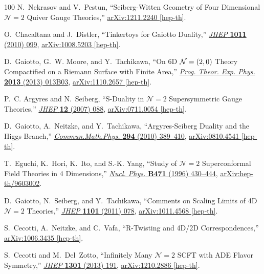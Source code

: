 \begin{thebibliography}{100}
N.~Nekrasov and V.~Pestun, ``{Seiberg-Witten Geometry of Four Dimensional ${\mathcal{N}}\!=2$ Quiver Gauge Theories},''
\href{http://arxiv.org/abs/1211.2240}{{\ttfamily arXiv:1211.2240 [hep-th]}}.

O.~Chacaltana and J.~Distler, ``{Tinkertoys for Gaiotto Duality},''
\href{http://dx.doi.org/10.1007/JHEP11(2010)099}{{\em JHEP} {\bfseries 1011} (2010) 099},
\href{http://arxiv.org/abs/1008.5203}{{\ttfamily arXiv:1008.5203 [hep-th]}}.

D.~Gaiotto, G.~W. Moore, and Y.~Tachikawa, ``{On 6D $\mathcal{N}=(2,0)$ Theory Compactified on a Riemann Surface with Finite Area},''
\href{http://dx.doi.org/10.1093/ptep/pts047}{{\em Prog. Theor. Exp. Phys.} {\bfseries 2013} (2013) 013B03},
\href{http://arxiv.org/abs/1110.2657}{{\ttfamily arXiv:1110.2657 [hep-th]}}.

P.~C. Argyres and N.~Seiberg, ``{S-Duality in ${\mathcal{N}}\!=2$ Supersymmetric Gauge Theories},''
\href{http://dx.doi.org/10.1088/1126-6708/2007/12/088}{{\em JHEP} {\bfseries 12} (2007) 088},
\href{http://arxiv.org/abs/0711.0054}{{\ttfamily arXiv:0711.0054 [hep-th]}}.

D.~Gaiotto, A.~Neitzke, and Y.~Tachikawa, ``{Argyres-Seiberg Duality and the Higgs Branch},''
\href{http://dx.doi.org/10.1007/s00220-009-0938-6}{{\em Commun.Math.Phys.} {\bfseries 294} (2010) 389--410},
\href{http://arxiv.org/abs/0810.4541}{{\ttfamily arXiv:0810.4541 [hep-th]}}.

T.~Eguchi, K.~Hori, K.~Ito, and S.-K. Yang, ``{Study of ${\mathcal{N}}\!=2$ Superconformal Field Theories in 4 Dimensions},''
\href{http://dx.doi.org/10.1016/0550-3213(96)00188-5}{{\em Nucl. Phys.} {\bfseries B471} (1996) 430--444},
\href{http://arxiv.org/abs/hep-th/9603002}{{\ttfamily arXiv:hep-th/9603002}}.

D.~Gaiotto, N.~Seiberg, and Y.~Tachikawa, ``{Comments on Scaling Limits of 4D ${\mathcal{N}}\!=2$ Theories},''
\href{http://dx.doi.org/10.1007/JHEP01(2011)078}{{\em JHEP} {\bfseries 1101} (2011) 078},
\href{http://arxiv.org/abs/1011.4568}{{\ttfamily arXiv:1011.4568 [hep-th]}}.

S.~Cecotti, A.~Neitzke, and C.~Vafa, ``{R-Twisting and 4D/2D Correspondences},''
\href{http://arxiv.org/abs/1006.3435}{{\ttfamily arXiv:1006.3435 [hep-th]}}.

S.~Cecotti and M.~Del~Zotto, ``{Infinitely Many ${\mathcal{N}}\!=2$ SCFT with ADE Flavor Symmetry},''
\href{http://dx.doi.org/10.1007/JHEP01(2013)191}{{\em JHEP} {\bfseries 1301} (2013) 191},
\href{http://arxiv.org/abs/1210.2886}{{\ttfamily arXiv:1210.2886 [hep-th]}}.


\end{thebibliography}
